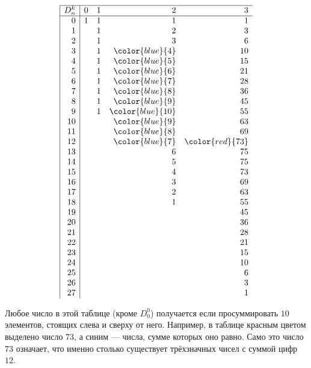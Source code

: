 \documentclass[12pt, letterpaper]{extarticle}
\begin{document}
\[
  \begin{array}{|r| r r r r}
    \hline
    D_n^k & 0 & 1 & 2 & 3 \\
    \hline
    0 & 1 & 1 & 1 & 1 \\
    1 &   & 1 & 2 & 3 \\
    2 &   & 1 & 3 & 6 \\
    3 &   & 1 & \color{blue}{4} & 10 \\
    4 &   & 1 & \color{blue}{5} & 15 \\
    5 &   & 1 & \color{blue}{6} & 21 \\
    6 &   & 1 & \color{blue}{7} & 28 \\
    7 &   & 1 & \color{blue}{8} & 36 \\
    8 &   & 1 & \color{blue}{9} & 45 \\
    9 &   & 1 & \color{blue}{10} & 55 \\
    10 &   &   & \color{blue}{9} & 63 \\
    11 &   &   & \color{blue}{8} & 69 \\
    12 &   &   & \color{blue}{7} & \color{red}{73} \\
    13 &   &   & 6 & 75 \\
    14 &   &   & 5 & 75 \\
    15 &   &   & 4 & 73 \\
    16 &   &   & 3 & 69 \\
    17 &   &   & 2 & 63 \\
    18 &   &   & 1 & 55 \\
    19 &   &   &   & 45 \\
    20 &   &   &   & 36 \\
    21 &   &   &   & 28 \\
    22 &   &   &   & 21 \\
    23 &   &   &   & 15 \\
    24 &   &   &   & 10 \\
    25 &   &   &   & 6 \\
    26 &   &   &   & 3 \\
    27 &   &   &   & 1 \\
  \end{array}
\]

Любое число в этой таблице (кроме $D_0^0$) получается если просуммировать $10$ элементов, стоящих слева и сверху от него. Например, в таблице красным цветом выделено число $73$, а синим — числа, сумме которых оно равно. Само это число $73$ означает, что именно столько существует трёхзначных чисел с суммой цифр $12$.
\end{document}
